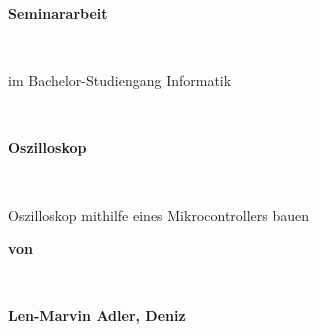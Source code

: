 \begin{titlepage}
\begin{Large}
\begin{flushleft}
\end{flushleft} 
\end{Large}

\vspace{0.150\textheight}
\begin{center}
 \begin{Huge} \textbf{Seminararbeit} \end{Huge}\\
 \vspace{2em}
 \begin{Large} im Bachelor-Studiengang Informatik \end{Large}
 \vspace{0.10\textheight}\\
 \begin{Huge} \textbf{Oszilloskop} \end{Huge}\\
 \vspace{1em}
 \begin{Large}Oszilloskop mithilfe eines Mikrocontrollers bauen\end{Large}

 \vspace{2em}
 \begin{Large}\textbf{von} \end{Large}\\
 \vspace{1em}
 \begin{Large}\textbf{Len-Marvin Adler, Deniz}\end{Large}\\
\end{center}
\vspace{0.100\textheight}


\end{titlepage}
